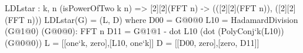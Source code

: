 

\begin{algorithm}[!htb]
	\caption{$\ldlalgo(\matG)$}\label{alg:ldlalgo}
	\begin{algorithmic}[1]
		\Return{$(\L, \matD )$}
	\end{algorithmic}
\end{algorithm}
 
\begin{code}
  LDLstar : {k, n} (isPowerOfTwo k n) =>
    [2][2](FFT n) -> (([2][2](FFT n)), ([2][2](FFT n)))
  LDLstar(G) = (L, D) where 
    D00 = G@0@0
    L10 = HadamardDivision (G@1@0) (G@0@0): FFT n
    D11 = G@1@1 - dot L10 (dot (PolyConj`{k}(L10)) (G@0@0))
    L = [[one`{k}, zero],[L10, one`{k}]]
    D = [[D00, zero],[zero, D11]]
\end{code}
 
